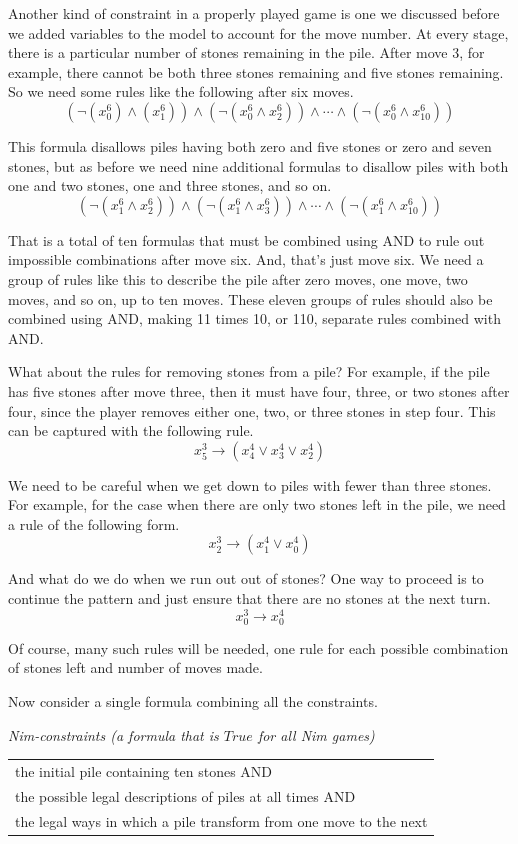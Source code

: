 {{Another kind of constraint in a properly played game is one
we discussed before we added variables to the model to account for the move number.
At every stage, there is a particular number of stones remaining in the pile.
After move 3, for example, there cannot be both three stones remaining
and five stones remaining.
So we need some rules like the following after six moves.
$$(\neg(x_{0}^{6}) \wedge (x_{1}^{6})) \wedge (\neg(x_{0}^{6} \wedge x_{2}^{6})) \wedge \cdots \wedge (\neg(x_{0}^{6} \wedge x_{10}^{6}))$$

This formula disallows piles having both zero and five stones or zero and seven stones,
but as before we need nine additional
formulas to disallow piles with both one and two stones, one and three stones, and so on.
$$(\neg(x_{1}^{6} \wedge x_{2}^{6})) \wedge (\neg(x_{1}^{6} \wedge x_{3}^{6})) \wedge \cdots \wedge (\neg(x_{1}^{6} \wedge x_{10}^{6}))$$

That is a total of ten formulas that must be combined using AND
to rule out impossible combinations after move six.
And, that's just move six.
We need a group of rules like this to describe the pile after zero moves,
one move, two moves, and so on, up to ten moves.
These eleven groups of rules should also be combined using AND,
making 11 times 10, or 110, separate rules combined with AND.

What about the rules for removing stones from a pile?
For example, if the pile has five stones after move three,
then it must have four, three, or two stones after four,
since the player removes either one, two, or three stones in step four.
This can
be captured with the following rule.
$$x_{5}^{3} \rightarrow (x_{4}^{4} \vee x_{3}^{4} \vee x_{2}^{4})$$

We need to be careful when we get down to piles with fewer than three stones.
For example, for the case when there are only
two stones left in the pile, we need a rule of the following form.
$$x_{2}^{3} \rightarrow (x_{1}^{4} \vee x_{0}^{4})$$

And what do we do when we run out out of stones?
One way to proceed is to continue the pattern
and just ensure that there are no stones at the next turn.
$$x_{0}^{3} \rightarrow x_{0}^{4}$$

Of course, many such rules will be needed,
one rule for each possible combination of stones left and number of moves made.

Now consider a single formula combining all the constraints.

\begin{center}
\emph{Nim-constraints (a formula that is $True$ for all Nim games)}
\begin{tabular}{l}
\hline
the initial pile containing ten stones AND\\
the possible legal descriptions of piles at all times AND\\
the legal ways in which a pile transform from one move to the next\\
\end{tabular}
\end{center}

}}
